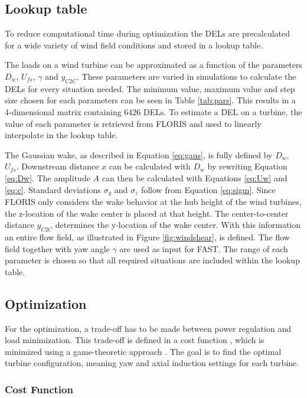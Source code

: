 \subsection{Lookup table} \label{sec:lut}
To reduce computational time during optimization the DELs are precalculated for a wide variety of wind field conditions and stored in a lookup table.

The loads on a wind turbine can be approximated as a function of the parameters $D_w$, $U_{fs}$, $\gamma$ and $y_{C2C}$. These parameters are varied in simulations to calculate the DELs for every situation needed. The minimum value, maximum value and step size chosen for each parameters can be seen in Table \ref{tab:pars}. This results in a 4-dimensional matrix containing 6426 DELs. To estimate a DEL on a turbine, the value of each parameter is retrieved from FLORIS and used to linearly interpolate in the lookup table.

The Gaussian wake, as described in Equation \ref{eq:gaus}, is fully defined by $D_w$, $U_{fs}$. Downstream distance $x$ can be calculated with $D_w$ by rewriting Equation \ref{eq:Dw}. The amplitude $A$ can then be calculated with Equations \ref{eq:Uw} and \ref{eq:c}. Standard deviations $\sigma_y$ and $\sigma_z$ follow from Equation \ref{eq:sigm}. Since FLORIS only considers the wake behavior at the hub height of the wind turbines, the z-location of the wake center is placed at that height. The center-to-center distance $y_{C2C}$ determines the y-location of the wake center. With this information an entire flow field, as illustrated in Figure \ref{fig:windshear}, is defined. The flow field together with yaw angle $\gamma$ are used as input for FAST. The range of each parameter is chosen so that all required situations are included within the lookup table.

\subsection{Optimization} \label{sec:optimization}
For the optimization, a trade-off has to be made between power regulation and load minimization. This trade-off is defined in a cost function \cite{Dijk2016, Marden2013}, which is minimized using a game-theoretic approach \cite{Marden2013}. The goal is to find the optimal turbine configuration, meaning yaw and axial induction settings for each turbine.
 

\subsubsection{Cost Function} \label{sec:costfunction}

